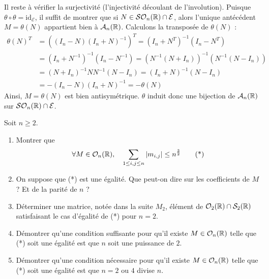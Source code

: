 \begin{solution}
\begin{enumerate}
		Il reste à vérifier la surjectivité (l'injectivité découlant de l'involution). Puisque $\theta \circ \theta = \mathrm{id}_{\mathcal E}$, il suffit de montrer que si $N \in \mathcal{SO}_n(\operatorname{\mathbb R}) \cap \mathcal E$, alors l'unique antécédent $M = \theta(N)$ appartient bien à $\mathcal A_n(\operatorname{\mathbb R})$. 
		Calculons la transposée de $\theta(N)$ :
		\begin{align*}
			\theta(N)^T &= \left((I_n-N)(I_n+N)^{-1}\right)^T = (I_n+N^T)^{-1}(I_n-N^T) \\
			&= (I_n+N^{-1})^{-1}(I_n-N^{-1}) = \left(N^{-1}(N+I_n)\right)^{-1}\left(N^{-1}(N-I_n)\right) \\
			&= (N+I_n)^{-1}N N^{-1}(N-I_n) = (I_n+N)^{-1}(N-I_n) \\
			&= -(I_n-N)(I_n+N)^{-1} = -\theta(N)
		\end{align*}
		Ainsi, $M = \theta(N)$ est bien antisymétrique. $\theta$ induit donc une bijection de $\mathcal A_n(\operatorname{\mathbb R})$ sur $\mathcal{SO}_n(\operatorname{\mathbb R})\cap \mathcal E$.
	\end{enumerate}
\end{solution}

\begin{exo}
	\label{euclidiens2}
	Soit $n\geq 2$.
	\begin{enumerate}
		\item Montrer que \[\forall M\in\mathcal O_n(\operatorname{\mathbb R}),\quad \sum_{1\leq i,j\leq n}|m_{i,j}|\leq n^{\frac32}\tag{*}\]
		\item On suppose que (*) est une égalité. Que peut-on dire sur les coefficients de $M$ ? Et de la parité de $n$ ?
		\item Déterminer une matrice, notée dans la suite $M_2$, élément de $\mathcal O_2(\operatorname{\mathbb R})\cap\mathcal S_2(\operatorname{\mathbb R})$ satisfaisant le cas d'égalité de (*) pour $n = 2$.
		\item Démontrer qu'une condition suffisante pour qu'il existe $M\in\mathcal O_n(\operatorname{\mathbb R})$ telle que (*) soit une égalité est que $n$ soit une puissance de $2$.
		\item Démontrer qu'une condition nécessaire pour qu'il existe $M\in\mathcal O_n(\operatorname{\mathbb R})$ telle que (*) soit une égalité est que $n=2$ ou $4$ divise $n$.
	\end{enumerate}
\end{exo}

